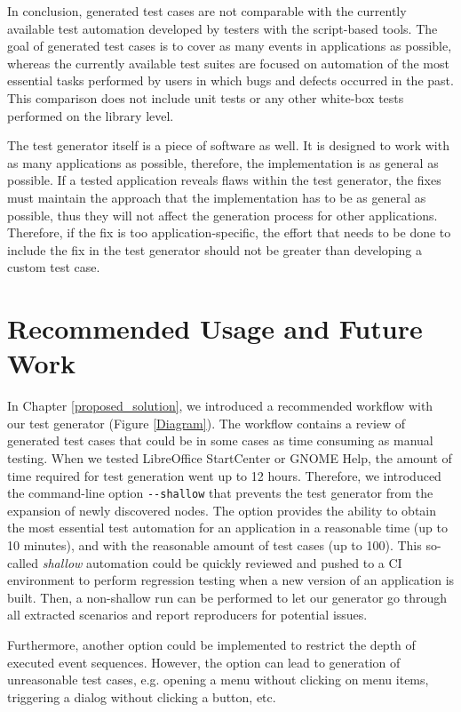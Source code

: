 In conclusion, generated test cases are not comparable with the currently available test automation developed by testers with the script-based tools. The goal of generated test cases is to cover as many events in applications as possible, whereas the currently available test suites are focused on automation of the most essential tasks performed by users in which bugs and defects occurred in the past. This comparison does not include unit tests or any other white-box tests performed on the library level.

The test generator itself is a piece of software as well. It is designed to work with as many applications as possible, therefore, the implementation is as general as possible. If a tested application reveals flaws within the test generator, the fixes must maintain the approach that the implementation has to be as general as possible, thus they will not affect the generation process for other applications. Therefore, if the fix is too application-specific, the effort that needs to be done to include the fix in the test generator should not be greater than developing a custom test case.

\section{Recommended Usage and Future Work}\label{future_work}
In Chapter \ref{proposed_solution}, we introduced a recommended workflow with our test generator (Figure \ref{Diagram}). The workflow contains a review of generated test cases that could be in some cases as time consuming as manual testing. When we tested LibreOffice StartCenter or GNOME Help, the amount of time required for test generation went up to 12 hours. 
Therefore, we introduced the command-line option \texttt{-{}-shallow} that prevents the test generator from the expansion of newly discovered nodes. The option provides the ability to obtain the most essential test automation for an application in a reasonable time (up to 10 minutes), and with the reasonable amount of test cases (up to 100). This so-called \textit{shallow} automation could be quickly reviewed and pushed to a CI environment to perform regression testing when a new version of an application is built. Then, a non-shallow run can be performed to let our generator go through all extracted scenarios and report reproducers for potential issues.

Furthermore, another option could be implemented to restrict the depth of executed event sequences. However, the option can lead to generation of unreasonable test cases, e.g. opening a menu without clicking on menu items, triggering a dialog without clicking a button, etc.

